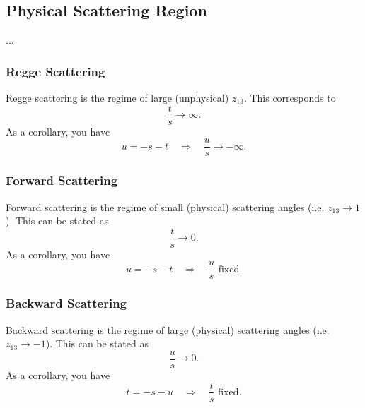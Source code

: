 \subsection{Physical Scattering Region}
...
\subsubsection{Regge Scattering}
Regge scattering is the regime of large (unphysical) $z_{13}$. This corresponds to
\begin{equation}
	\frac{t}{s} \rightarrow \infty.
\end{equation}
As a corollary, you have
\begin{equation}
	u = - s - t \quad \Longrightarrow \quad \frac{u}{s} \rightarrow -\infty.
\end{equation}
\subsubsection{Forward Scattering}
Forward scattering is the regime of small (physical) scattering angles (i.e. $z_{13} \rightarrow 1$). This can be stated as
\begin{equation}
	\frac{t}{s} \rightarrow 0.
\end{equation}
As a corollary, you have
\begin{equation}
	u = - s - t \quad \Longrightarrow \quad \frac{u}{s} \text{ fixed}.
\end{equation}
\subsubsection{Backward Scattering}
Backward scattering is the regime of large (physical) scattering angles (i.e. $z_{13} \rightarrow -1$). This can be stated as
\begin{equation}
	\frac{u}{s} \rightarrow 0.
\end{equation}
As a corollary, you have
\begin{equation}
	t = - s - u \quad \Longrightarrow \quad \frac{t}{s} \text{ fixed}.
\end{equation}
